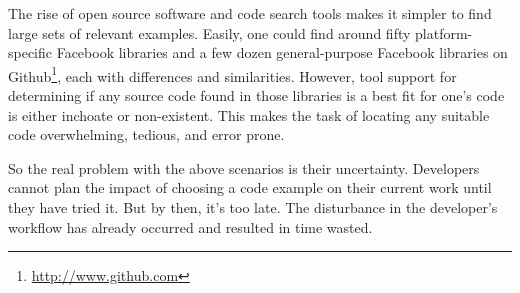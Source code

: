 The rise of open source software and code search tools makes it simpler to find large sets of relevant examples. Easily, one could find around fifty platform-specific Facebook libraries and a few dozen general-purpose Facebook libraries on Github\footnote{\url{http://www.github.com}}, each with differences and similarities. However, tool support for determining if any source code found in those libraries is a best fit for one's code is either inchoate or non-existent. This makes the task of locating any suitable code overwhelming, tedious, and error prone. %

So the real problem with the above scenarios is their uncertainty. Developers cannot plan the impact of choosing a code example on their current work until they have tried it. But by then, it’s too late. The disturbance in the developer's workflow has already occurred and resulted in time wasted.

